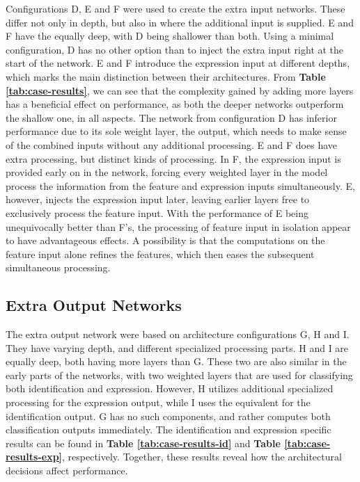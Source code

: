Configurations D, E and F were used to create the extra input networks. These differ not only in depth, but also in where the additional input is supplied. E and F have the equally deep, with D being shallower than both. Using a minimal configuration, D has no other option than to inject the extra input right at the start of the network. E and F introduce the expression input at different depths, which marks the main distinction between their architectures. From \textbf{Table \ref{tab:case-results}}, we can see that the complexity gained by adding more layers has a beneficial effect on performance, as both the deeper networks outperform the shallow one, in all aspects. The network from configuration D has inferior performance due to its sole weight layer, the output, which needs to make sense of the combined inputs without any additional processing. E and F does have extra processing, but distinct kinds of processing. In F, the expression input is provided early on in the network, forcing every weighted layer in the model process the information from the feature and expression inputs simultaneously. E, however, injects the expression input later, leaving earlier layers free to exclusively process the feature input. With the performance of E being unequivocally better than F's, the processing of feature input in isolation appear to have advantageous effects. A possibility is that the computations on the feature input alone refines the features, which then eases the subsequent simultaneous processing. 

\subsection{Extra Output Networks}

The extra output network were based on architecture configurations G, H and I. They have varying depth, and different specialized processing parts. H and I are equally deep, both having more layers than G. These two are also similar in the early parts of the networks, with two weighted layers that are used for classifying both identification and expression. However, H utilizes additional specialized processing for the expression output, while I uses the equivalent for the identification output. G has no such components, and rather computes both classification outputs immediately. The identification and expression specific results can be found in \textbf{Table \ref{tab:case-results-id}} and \textbf{Table \ref{tab:case-results-exp}}, respectively. Together, these results reveal how the architectural decisions affect performance. \\


